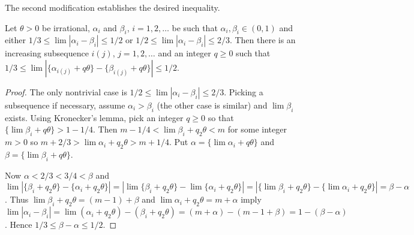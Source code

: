 \documentclass[12pt]{article}
\begin{document}
The second modification establishes the desired inequality.
\begin{lemma}\label{normalize}
Let $\theta>0$ be irrational, $\alpha_i$ and $\beta_i$, $i=1,2,\ldots$
be such that $\alpha_i,\beta_i\in(0,1)$ and either $1/3\leq\lim|\alpha_i-\beta_i|\leq1/2$ or
$1/2\leq\lim|\alpha_i-\beta_i|\leq2/3$. Then there is an increasing
subsequence $i(j)$, $j=1,2,\ldots$ and an integer $q\geq0$ such
that
$1/3\leq\lim|\{\alpha_{i(j)}+q\theta\}-\{\beta_{i(j)}+q\theta\}|\leq1/2$.
\end{lemma}
\begin{proof}
The only nontrivial case is
$1/2\leq\lim|\alpha_i-\beta_i|\leq2/3$. Picking
a subsequence if necessary, assume $\alpha_i>\beta_i$ (the other case
is similar) and
$\lim\beta_i$ exists. Using Kronecker's lemma, pick an integer $q\geq0$
so that $\{\lim\beta_i+q\theta\}>1-1/4$. Then $m-1/4<\lim\beta_i+q_2\theta<m$
for some integer $m>0$ so $m+2/3>\lim\alpha_i+q_2\theta>m+1/4$.
Put $\alpha=\{\lim\alpha_i+q\theta\}$ and
$\beta=\{\lim\beta_i+q\theta\}$.

Now $\alpha<2/3<3/4<\beta$ and
$\lim|\{\beta_i+q_2\theta\}-\{\alpha_i+q_2\theta\}|=|\lim\{\beta_i+q_2\theta\}-\lim\{\alpha_i+q_2\theta\}|=|\{\lim\beta_i+q_2\theta\}-\{\lim\alpha_i+q_2\theta\}|=\beta-\alpha$.
Thus $\lim\beta_i+q_2\theta=(m-1)+\beta$ and
$\lim\alpha_i+q_2\theta=m+\alpha$ imply
$\lim|\alpha_i-\beta_i|=\lim(\alpha_i+q_2\theta)-(\beta_i+q_2\theta)=(m+\alpha)-(m-1+\beta)=1-(\beta-\alpha)$. Hence
$1/3\leq\beta-\alpha\leq1/2$. 
\end{proof}
\end{document}
